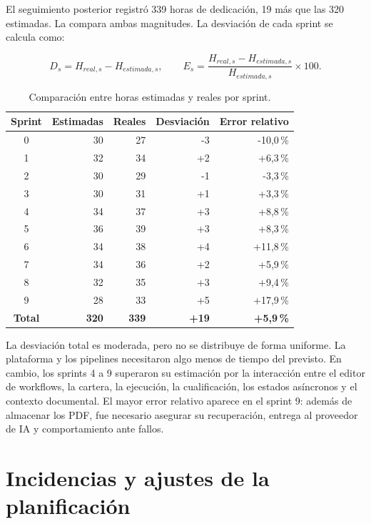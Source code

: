 El seguimiento posterior registró 339 horas de dedicación, 19 más que las 320
estimadas. La  compara ambas magnitudes. La
desviación de cada sprint se calcula como:

\begin{equation}
  D_s = H_{real,s} - H_{estimada,s},
  \qquad
  E_s = \frac{H_{real,s} - H_{estimada,s}}{H_{estimada,s}} \times 100.
\end{equation}

\begin{table}[H]
  \centering
  \small
  \caption{Comparación entre horas estimadas y reales por sprint.}
  \label{tab:sprint-effort-deviation}
  \begin{tabular}{@{}crrrr@{}}
    \toprule
    \textbf{Sprint} & \textbf{Estimadas} & \textbf{Reales} & \textbf{Desviación} & \textbf{Error relativo} \\
    \midrule
    0 & 30 & 27 & -3 & -10,0\,\% \\
    1 & 32 & 34 & +2 & +6,3\,\% \\
    2 & 30 & 29 & -1 & -3,3\,\% \\
    3 & 30 & 31 & +1 & +3,3\,\% \\
    4 & 34 & 37 & +3 & +8,8\,\% \\
    5 & 36 & 39 & +3 & +8,3\,\% \\
    6 & 34 & 38 & +4 & +11,8\,\% \\
    7 & 34 & 36 & +2 & +5,9\,\% \\
    8 & 32 & 35 & +3 & +9,4\,\% \\
    9 & 28 & 33 & +5 & +17,9\,\% \\
    \midrule
    \textbf{Total} & \textbf{320} & \textbf{339} & \textbf{+19} & \textbf{+5,9\,\%} \\
    \bottomrule
  \end{tabular}
\end{table}

La desviación total es moderada, pero no se distribuye de forma uniforme. La
plataforma y los pipelines necesitaron algo menos de tiempo del previsto. En
cambio, los sprints 4 a 9 superaron su estimación por la interacción entre el
editor de workflows, la cartera, la ejecución, la cualificación, los estados
asíncronos y el contexto documental. El mayor error relativo aparece en el
sprint 9: además de almacenar los PDF, fue necesario asegurar su recuperación,
entrega al proveedor de IA y comportamiento ante fallos.

\section{Incidencias y ajustes de la planificación}

